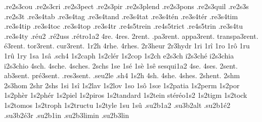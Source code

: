 {                    .re2s3cou
                    .re2s3cri
                    .re2s3pect
                    .re2s3pir
                    .re2s3plend
                    .re2s3pons
                    .re2s3quil
                    .re2s3s
                    .re2s3t
                    .re3s4tab
                    .re3s4tag
                    .re3s4tand
                    .re3s4tat
                    .re3s4tén
                    .re3s4tér
                    .re3s4tim
                    .re3s4tip
                    .re3s4toc
                    .re3s4top
                    .re3s4tr
                    .re4s5trein
                    .re4s5trict
                    .re4s5trin
                    .re3s4tu
                    .re3s4ty
                    .réu2 %
                    .ré2uss
                    .rétro1a2
4re.
4res.
       2rent. %
    .pa3rent.
   appa3rent.
transpa3rent.
    é3rent.
    tor3rent.
    cur3rent.
%
1r2h
4rhe.
4rhes.
                    2r3heur
                    2r3hydr
1ri
1rî
1ro
1rô
1ru
1rû
1ry
1sa
1sâ
.sch4
                    1s2caph
                    1s2clér
                    1s2cop
 1s2ch
e2s3ch
i2s3ché
i2s3chia
i2s3chio
4sch.
4sche.
4sches.
2schs
1se
1sé
1sè
1sê
                    sesqui1a2
4se.
4ses.
    2sent. %
  ab3sent.
 pré3sent.
.res3sent.
%
.seu2le %
.sh4
1s2h
4sh.
4she.
4shes.
2shent. %
2shm
                    2s3hom
2shr
2shs
1si
1sî
                    1s2lav
                    1s2lov
1so
1sô
1sœ
                    1s2patia
                    1s2perm
                    1s2por
                    1s2phèr
                    1s2phér
                    1s2piel
                    1s2piros
                    1s2tandard
                    1s2tein
                    stéréo1s2
                    1s2tigm
                    1s2tock
                    1s2tomos
                    1s2troph
                    1s2tructu
                    1s2tyle
1su
1sû
                    .su2b1a2
                    .su3b2alt
                    .su2b1é2
                    .su3b2é3r
                    .su2b1in
                    .su2b3limin
                    .su2b3lin
}
